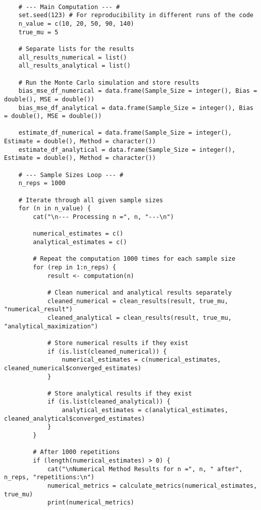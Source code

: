 \documentclass{report}
\begin{document}
\begin{verbatim}
    
    
    
    
    # --- Main Computation --- #
    set.seed(123) # For reproducibility in different runs of the code
    n_value = c(10, 20, 50, 90, 140)
    true_mu = 5
    
    # Separate lists for the results
    all_results_numerical = list() 
    all_results_analytical = list()
    
    # Run the Monte Carlo simulation and store results
    bias_mse_df_numerical = data.frame(Sample_Size = integer(), Bias = double(), MSE = double())
    bias_mse_df_analytical = data.frame(Sample_Size = integer(), Bias = double(), MSE = double())
    
    estimate_df_numerical = data.frame(Sample_Size = integer(), Estimate = double(), Method = character())
    estimate_df_analytical = data.frame(Sample_Size = integer(), Estimate = double(), Method = character())
    
    # --- Sample Sizes Loop --- #
    n_reps = 1000
    
    # Iterate through all given sample sizes
    for (n in n_value) {
        cat("\n--- Processing n =", n, "---\n")
    
        numerical_estimates = c()
        analytical_estimates = c()
    
        # Repeat the computation 1000 times for each sample size
        for (rep in 1:n_reps) {
            result <- computation(n)
          
            # Clean numerical and analytical results separately
            cleaned_numerical = clean_results(result, true_mu, "numerical_result")
            cleaned_analytical = clean_results(result, true_mu, "analytical_maximization")
    
            # Store numerical results if they exist
            if (is.list(cleaned_numerical)) {
                numerical_estimates = c(numerical_estimates, cleaned_numerical$converged_estimates)
            }
    
            # Store analytical results if they exist
            if (is.list(cleaned_analytical)) {
                analytical_estimates = c(analytical_estimates, cleaned_analytical$converged_estimates)
            }
        }
    
        # After 1000 repetitions
        if (length(numerical_estimates) > 0) {
            cat("\nNumerical Method Results for n =", n, " after", n_reps, "repetitions:\n")
            numerical_metrics = calculate_metrics(numerical_estimates, true_mu)
            print(numerical_metrics)
    

\end{verbatim}
\end{document}
